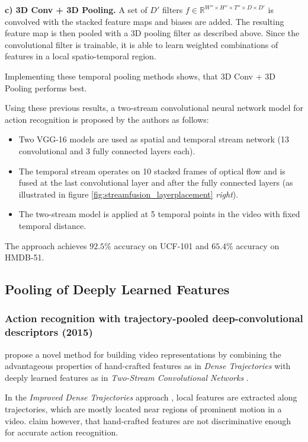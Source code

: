 \textbf{c) 3D Conv + 3D Pooling.}
A set of $D'$ filters $f \in \mathbb{R}^{W'' \times H'' \times T'' \times D \times D'}$ is convolved with the stacked feature maps and biases are added.
The resulting feature map is then pooled with a 3D pooling filter as described above.
Since the convolutional filter is trainable, it is able to learn weighted combinations of features in a local spatio-temporal region.

Implementing these temporal pooling methods shows, that 3D Conv + 3D Pooling performs best.

Using these previous results, a two-stream convolutional neural network model for action recognition is proposed by the authors as follows:
\begin{itemize}
    \item Two VGG-16 models \cite{simonyan_very_2014} are used as spatial and temporal stream network (13 convolutional and 3 fully connected layers each).
    \item The temporal stream operates on 10 stacked frames of optical flow and is fused at the last convolutional layer and after the fully connected layers (as illustrated in figure \ref{fig:streamfusion_layerplacement} \textit{right}).
    \item The two-stream model is applied at 5 temporal points in the video with fixed temporal distance.
\end{itemize}

The approach achieves $92.5\%$ accuracy on UCF-101 and $65.4\%$ accuracy on HMDB-51.


\subsection{Pooling of Deeply Learned Features}

\subsubsection{Action recognition with trajectory-pooled deep-convolutional descriptors (2015)}
\textcite{wang_action_2015} propose a novel method for building video representations by combining the advantageous properties of hand-crafted features as in \textit{Dense Trajectories} \cite{wang_action_2013} with deeply learned features as in \textit{Two-Stream Convolutional Networks} \cite{simonyan_two-stream_2014}.

In the \textit{Improved Dense Trajectories} approach \cite{wang_action_2013}, local features are extracted along trajectories, which are mostly located near regions of prominent motion in a video.
\textcite{wang_action_2015} claim however, that hand-crafted features are not discriminative enough for accurate action recognition.

